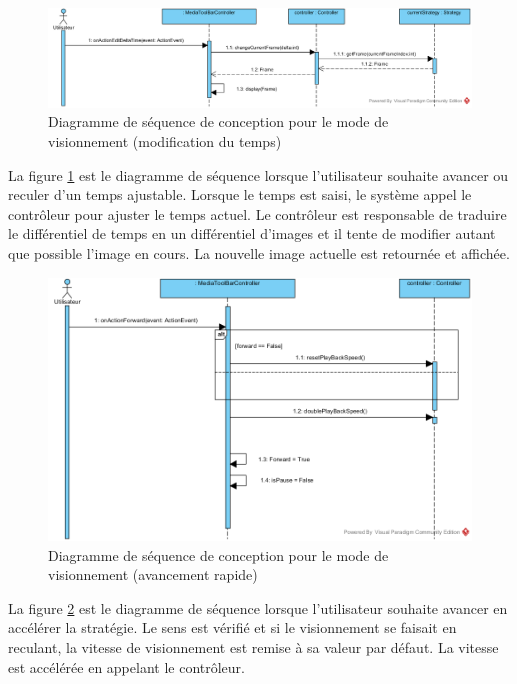 \begin{figure}[htpb]
    \centering
    \includegraphics[scale=0.3]{fig/dsc_edit_delta_frame.png}
    \caption{Diagramme de séquence de conception pour le mode de visionnement (modification du temps)}
    \label{fig:dsc_view_edit_idx}
\end{figure}

La figure \ref{fig:dsc_view_edit_idx} est le diagramme de séquence lorsque l'utilisateur souhaite avancer ou reculer d'un temps ajustable.
Lorsque le temps est saisi, le système appel le contrôleur pour ajuster le temps actuel.
Le contrôleur est responsable de traduire le différentiel de temps en un différentiel d'images et il tente de modifier autant que possible l'image en cours.
La nouvelle image actuelle est retournée et affichée.

\begin{figure}[htpb]
    \centering
    \includegraphics[scale=0.3]{fig/dsc_forward_frame_index.png}
    \caption{Diagramme de séquence de conception pour le mode de visionnement (avancement rapide)}
    \label{fig:dsc_view_forward}
\end{figure}

La figure \ref{fig:dsc_view_forward} est le diagramme de séquence lorsque l'utilisateur souhaite avancer en accélérer la stratégie.
Le sens est vérifié et si le visionnement se faisait en reculant, la vitesse de visionnement est remise à sa valeur par défaut.
La vitesse est accélérée en appelant le contrôleur.

